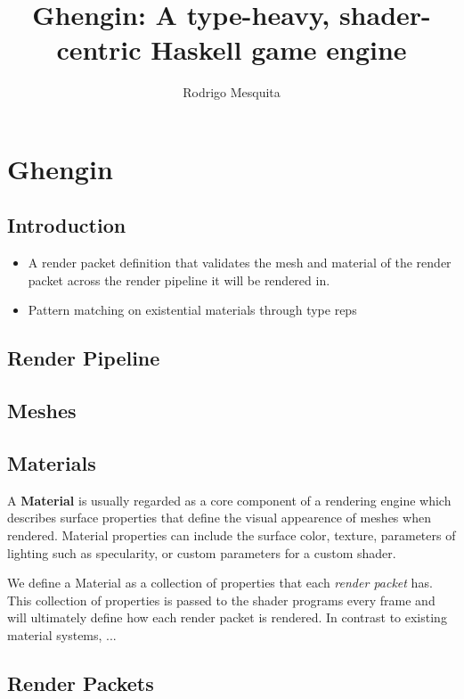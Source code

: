 \documentclass[a4paper,openright]{memoir}
\title{Ghengin: A type-heavy, shader-centric Haskell game engine}
\author{Rodrigo Mesquita}
\begin{document}
\maketitle

\chapter{Ghengin}

\section{Introduction}

\begin{itemize}
  \item A render packet definition that validates the mesh and material of the
    render packet across the render pipeline it will be rendered in.
  \item Pattern matching on existential materials through type reps
\end{itemize}

\section{Render Pipeline}

\section{Meshes}

\section{Materials}

A \textbf{Material} is usually regarded as a core component of a rendering
engine which describes surface properties that define the visual appearence of
meshes when rendered. Material properties can include the surface color,
texture, parameters of lighting such as specularity, or custom parameters for a
custom shader.

We define a Material as a collection of properties that each \emph{render
packet} has. This collection of properties is passed to the shader programs
every frame and will ultimately define how each render packet is rendered. In
contrast to existing material systems, ...

\section{Render Packets}



\end{document}
